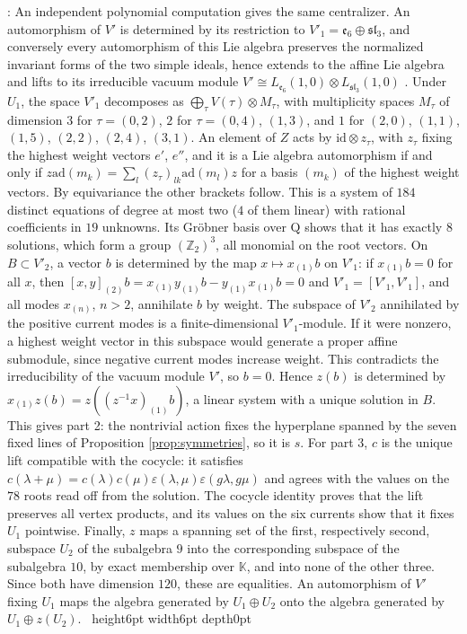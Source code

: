 \documentclass[leqno]{article}
\newcommand{\K}{\ensuremath{\mathbb{K}}}
\newcommand{\Q}{\mathrm{Q}}
\newcommand{\Z}{\ensuremath{\mathbb{Z}}}
\newcommand{\qed}{\hfill \vrule height6pt  width6pt depth0pt}
\newcommand{\ot}{\otimes}
\newcommand{\epsi}{\varepsilon}
\newenvironment{proof}[1][]{\noindent {\it Proof #1} : }{\hbox{~}\qed
\smallskip
}
\numberwithin{equation}{section}
\begin{document}
\begin{proof}
An independent polynomial computation gives the same centralizer. An automorphism of $V'$ is determined by its restriction to $V'_1 = \mathfrak e_6 \oplus \mathfrak{sl}_3$, and conversely every automorphism of this Lie algebra preserves the normalized invariant forms of the two simple ideals, hence extends to the affine Lie algebra and lifts to its irreducible vacuum module $V' \cong L_{\mathfrak e_6}(1,0) \ot L_{\mathfrak{sl}_3}(1,0)$ \cite{Kac90}. Under $U_1$, the space $V'_1$ decomposes as $\bigoplus_\tau V(\tau) \ot M_\tau$, with multiplicity spaces $M_\tau$ of dimension $3$ for $\tau = (0,2)$, $2$ for $\tau = (0,4)$, $(1,3)$, and $1$ for $(2,0)$, $(1,1)$, $(1,5)$, $(2,2)$, $(2,4)$, $(3,1)$. An element of $Z$ acts by $\mathrm{id} \ot z_\tau$, with $z_\tau$ fixing the highest weight vectors $e'$, $e''$, and it is a Lie algebra automorphism if and only if $z \mathrm{ad}(m_k) = \sum_l (z_\tau)_{lk} \mathrm{ad}(m_l) z$ for a basis $(m_k)$ of the highest weight vectors. By equivariance the other brackets follow. This is a system of $184$ distinct equations of degree at most two ($4$ of them linear) with rational coefficients in $19$ unknowns. Its Gröbner basis over $\Q$ shows that it has exactly $8$ solutions, which form a group $(\Z_2)^3$, all monomial on the root vectors. On $B \subset V'_2$, a vector $b$ is determined by the map $x \mapsto x_{(1)}b$ on $V'_1$: if $x_{(1)}b = 0$ for all $x$, then $[x,y]_{(2)}b = x_{(1)}y_{(1)}b - y_{(1)}x_{(1)}b = 0$ and $V'_1 = [V'_1,V'_1]$, and all modes $x_{(n)}$, $n > 2$, annihilate $b$ by weight. The subspace of $V'_2$ annihilated by the positive current modes is a finite-dimensional $V'_1$-module. If it were nonzero, a highest weight vector in this subspace would generate a proper affine submodule, since negative current modes increase weight. This contradicts the irreducibility of the vacuum module $V'$, so $b = 0$. Hence $z(b)$ is determined by $x_{(1)}z(b) = z((z^{-1}x)_{(1)}b)$, a linear system with a unique solution in $B$. This gives part 2: the nontrivial action fixes the hyperplane spanned by the seven fixed lines of Proposition \ref{prop:symmetries}, so it is $s$. For part 3, $c$ is the unique lift compatible with the cocycle: it satisfies $c(\lambda+\mu) = c(\lambda)c(\mu)\epsi(\lambda,\mu)\epsi(g\lambda,g\mu)$ and agrees with the values on the $78$ roots read off from the solution. The cocycle identity proves that the lift preserves all vertex products, and its values on the six currents show that it fixes $U_1$ pointwise. Finally, $z$ maps a spanning set of the first, respectively second, subspace $U_2$ of the subalgebra $9$ into the corresponding subspace of the subalgebra $10$, by exact membership over $\K$, and into none of the other three. Since both have dimension $120$, these are equalities. An automorphism of $V'$ fixing $U_1$ maps the algebra generated by $U_1 \oplus U_2$ onto the algebra generated by $U_1 \oplus z(U_2)$.
\end{proof}
\end{document}
